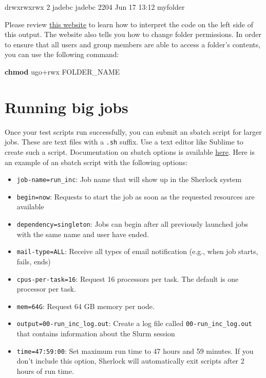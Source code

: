 \documentclass[
]{book}
\newenvironment{Shaded}{\begin{snugshade}}{\end{snugshade}}
\newcommand{\ExtensionTok}[1]{#1}
\newcommand{\FunctionTok}[1]{\textcolor[rgb]{0.13,0.29,0.53}{\textbf{#1}}}
\newcommand{\NormalTok}[1]{#1}
\providecommand{\tightlist}{%
  \setlength{\itemsep}{0pt}\setlength{\parskip}{0pt}}
\begin{document}
\begin{Shaded}
\begin{Highlighting}[]
\ExtensionTok{drwxrwxrwx}\NormalTok{ 2 jadebc jadebc  2204 Jun 17 13:12 myfolder}
\end{Highlighting}
\end{Shaded}

Please review \href{https://www.chriswrites.com/how-to-change-file-permissions-using-the-terminal/}{this website} to learn how to interpret the code on the left side of this output. The website also tells you how to change folder permissions. In order to ensure that all users and group members are able to access a folder's contents, you can use the following command:

\begin{Shaded}
\begin{Highlighting}[]
\FunctionTok{chmod}\NormalTok{ ugo+rwx FOLDER\_NAME}
\end{Highlighting}
\end{Shaded}

\section{Running big jobs}\label{running-big-jobs-1}

Once your test scripts run successfully, you can submit an sbatch script for larger jobs. These are text files with a \texttt{.sh} suffix. Use a text editor like Sublime to create such a script. Documentation on sbatch options is available \href{https://slurm.schedmd.com/sbatch.html}{here}. Here is an example of an sbatch script with the following options:

\begin{itemize}
\tightlist
\item
  \texttt{job-name=run\_inc}: Job name that will show up in the Sherlock system
\item
  \texttt{begin=now}: Requests to start the job as soon as the requested resources are available
\item
  \texttt{dependency=singleton}: Jobs can begin after all previously launched jobs with the same name and user have ended.
\item
  \texttt{mail-type=ALL}: Receive all types of email notification (e.g., when job starts, fails, ends)
\item
  \texttt{cpus-per-task=16}: Request 16 processors per task. The default is one processor per task.
\item
  \texttt{mem=64G}: Request 64 GB memory per node.
\item
  \texttt{output=00-run\_inc\_log.out}: Create a log file called \texttt{00-run\_inc\_log.out} that contains information about the Slurm session
\item
  \texttt{time=47:59:00}: Set maximum run time to 47 hours and 59 minutes. If you don't include this option, Sherlock will automatically exit scripts after 2 hours of run time.
\end{itemize}
\end{document}
